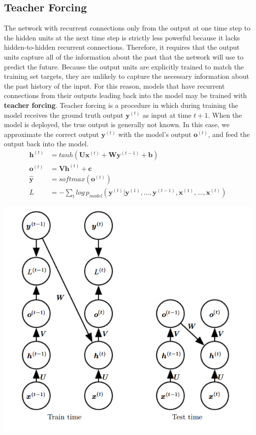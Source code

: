 \subsection{Teacher Forcing}
The network with recurrent connections only from the output at one time step to the hidden units at the next time step is strictly less powerful because it lacks hidden-to-hidden recurrent connections. Therefore, it requires that the output units capture all of the information about the past that the network will use to predict the future. Because the output units are explicitly trained to match the training set targets, they are unlikely to capture the necessary information about the past history of the input.\newline\newline
For this reason, models that have recurrent connections from their outputs leading back into the model may be trained with \textbf{teacher forcing}. Teacher forcing is a procedure in which during training the model receives the ground truth output $\textbf{y}^{(t)}$ as input at time $t + 1$. When the model is deployed, the true output is generally not known. In this case, we approximate the correct output $\textbf{y}^{(t)}$ with the model’s output $\textbf{o}^{(t)}$, and feed the output back into the model.
\[\begin{split}
    \textbf{h}^{(t)} & = tanh(\textbf{U}\textbf{x}^{(t)} + \textbf{W}\textbf{y}^{(t-1)} + \textbf{b})\\
    \textbf{o}^{(t)} & = \textbf{V}\textbf{h}^{(t)} + \textbf{c}\\
    \hat{\textbf{y}} & = softmax(\textbf{o}^{(t)})\\
    L & = - \sum_t log\,p_{model}(\textbf{y}^{(t)} | \textbf{y}^{(1)}, ..., \textbf{y}^{(t-1)}, \textbf{x}^{(1)}, ..., \textbf{x}^{(t)})
\end{split}\]
\begin{center}
    \includegraphics[]{images/teacher-forcing.png}
\end{center}
